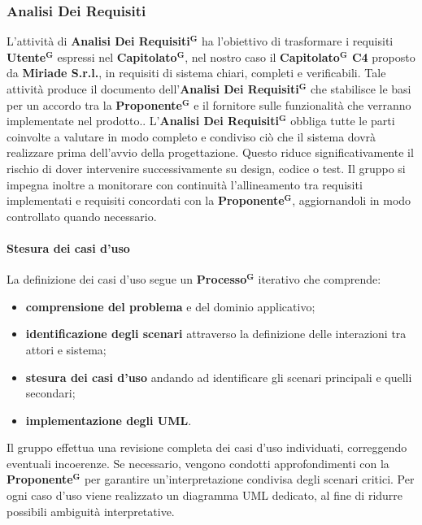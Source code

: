 \documentclass[a4paper,12pt]{article}
\newcommand{\term}[1]{\textbf{#1}$^\mathbf{G}$}
\begin{document}
\subsubsection{Analisi Dei Requisiti}
L'attività di \term{Analisi Dei Requisiti} ha l’obiettivo di trasformare i requisiti \term{Utente} espressi nel \term{Capitolato}, nel nostro caso il \textbf{\term{Capitolato} C4} proposto da \textbf{Miriade S.r.l.}, in requisiti di sistema chiari, completi e verificabili. 
Tale attività produce il documento dell'\term{Analisi Dei Requisiti} che stabilisce le basi per un accordo tra la \term{Proponente} e il fornitore sulle funzionalità che verranno implementate nel prodotto..
L’\term{Analisi Dei Requisiti} obbliga tutte le parti coinvolte a valutare in modo completo e condiviso ciò che il sistema dovrà realizzare prima dell’avvio della progettazione. Questo riduce significativamente il rischio di dover intervenire successivamente su design, codice o test.
Il gruppo si impegna inoltre a monitorare con continuità l’allineamento tra requisiti implementati e requisiti concordati con la \term{Proponente}, aggiornandoli in modo controllato quando necessario.

\paragraph{Stesura dei casi d'uso}

La definizione dei casi d’uso segue un \term{Processo} iterativo che comprende:
\begin{itemize}
    \item \textbf{comprensione del problema} e del dominio applicativo;
    \item \textbf{identificazione degli scenari} attraverso la definizione delle interazioni tra attori e sistema;
    \item \textbf{stesura dei casi d'uso} andando ad identificare gli scenari principali e quelli secondari;
    \item \textbf{implementazione degli UML}.
\end{itemize}

Il gruppo effettua una revisione completa dei casi d'uso individuati, correggendo eventuali incoerenze. Se necessario, vengono condotti approfondimenti con la \term{Proponente} per garantire un’interpretazione condivisa degli scenari critici.
Per ogni caso d’uso viene realizzato un diagramma UML dedicato, al fine di ridurre possibili ambiguità interpretative.\\
\end{document}
